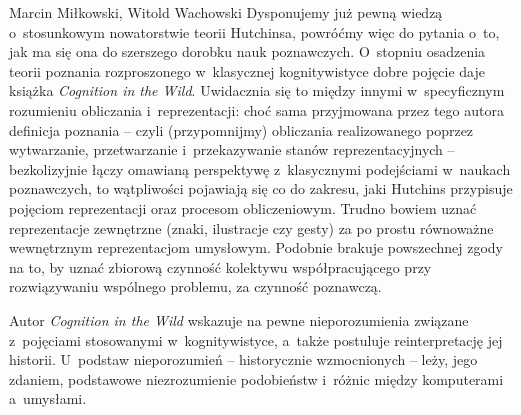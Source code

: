 \begin{artplenv2auth}{Marcin Miłkowski, Witold Wachowski}
Dysponujemy już pewną wiedzą o~stosunkowym nowatorstwie teorii Hutchinsa, powróćmy więc do pytania o~to, jak ma się ona do szerszego dorobku nauk poznawczych. O~stopniu osadzenia teorii poznania rozproszonego w~klasycznej kognitywistyce dobre pojęcie daje książka \textit{Cognition in the Wild}. Uwidacznia się to między innymi w~specyficznym rozumieniu obliczania i~reprezentacji: choć sama przyjmowana przez tego autora definicja poznania -- czyli (przypomnijmy) obliczania realizowanego poprzez wytwarzanie, przetwarzanie i~przekazywanie stanów reprezentacyjnych -- bezkolizyjnie łączy omawianą perspektywę z~klasycznymi podejściami w~naukach poznawczych, to wątpliwości pojawiają się co do zakresu, jaki Hutchins przypisuje pojęciom reprezentacji oraz procesom obliczeniowym. Trudno bowiem uznać reprezentacje zewnętrzne (znaki, ilustracje czy gesty) za po prostu równoważne wewnętrznym reprezentacjom umysłowym. Podobnie brakuje powszechnej zgody na to, by uznać zbiorową czynność kolektywu współpracującego przy rozwiązywaniu wspólnego problemu, za czynność poznawczą.

Autor \textit{Cognition in the Wild} wskazuje na pewne nieporozumienia związane z~pojęciami stosowanymi w~kognitywistyce, a~także postuluje reinterpretację jej historii. U~podstaw nieporozumień -- historycznie wzmocnionych -- leży, jego zdaniem, podstawowe niezrozumienie podobieństw i~różnic między komputerami a~umysłami.


\end{artplenv2auth}
